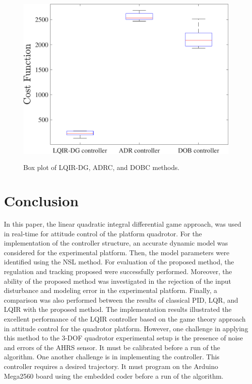 \documentclass[3p]{elsarticle}
\begin{document}
\begin{figure}[H]
    \centering
    {\includegraphics[width=.55\linewidth]{../Figure/implementation/box_plot/lqidgvsboxplot_ADR}
    }
    \caption{Box plot of LQIR-DG, ADRC, and DOBC methods.}
    \label{fig:compare_boxplot_ADR}
\end{figure}


\newpage

\section{Conclusion}\label{sec:conclusion}
\vspace{-0.15cm}
\noindent In this paper, the linear quadratic integral differential game approach, was used in real-time for attitude control of the platform quadrotor. %
For the implementation of the controller structure, an accurate dynamic model was considered for the experimental platform.
Then, the model parameters were identified using the NSL method.
For evaluation of the proposed method, the regulation and tracking proposed were successfully performed.
Moreover, the ability of the proposed method was investigated in the rejection of the input disturbance and modeling error in the experimental platform.
Finally, a comparison
was also performed between the results of classical PID, LQR, and LQIR with the proposed method.
The implementation results illustrated the excellent performance of the LQIR controller based on the game theory approach in attitude control for the quadrotor platform. However, one challenge in applying this method to the 3-DOF quadrotor experimental setup is the presence of noise and errors of the AHRS sensor. It must be calibrated before a run of the algorithm. One another challenge is in implementing the controller. This controller requires a desired trajectory. It must program on the Arduino Mega2560 board using the embedded coder before a run of the algorithm.


\end{document}
